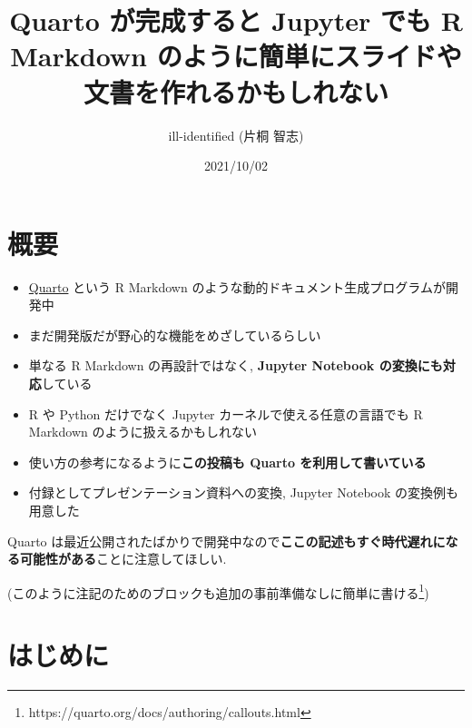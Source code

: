 \documentclass[
  letterpaper,
  DIV=11,
  pandoc,
  ja=standard,
  jafont=noto-otf]{bxjsarticle}
\title{Quarto が完成すると Jupyter でも R Markdown
のように簡単にスライドや文書を作れるかもしれない}
\author{ill-identified (片桐 智志)}
\date{2021/10/02}
\providecommand{\tightlist}{%
  \setlength{\itemsep}{0pt}\setlength{\parskip}{0pt}}
\begin{document}
\maketitle

{
\hypersetup{linkcolor=}
\setcounter{tocdepth}{3}
\tableofcontents
}
\hypertarget{ux6982ux8981}{%
\section*{概要}\label{ux6982ux8981}}

\begin{itemize}
\tightlist
\item
  \href{https://quarto.org/}{Quarto} という R Markdown
  のような動的ドキュメント生成プログラムが開発中
\item
  まだ開発版だが野心的な機能をめざしているらしい
\item
  単なる R Markdown の再設計ではなく, \textbf{Jupyter Notebook
  の変換にも対応}している
\item
  R や Python だけでなく Jupyter カーネルで使える任意の言語でも R
  Markdown のように扱えるかもしれない
\item
  使い方の参考になるように\textbf{この投稿も Quarto
  を利用して書いている}
\item
  付録としてプレゼンテーション資料への変換, Jupyter Notebook
  の変換例も用意した
\end{itemize}

\begin{tcolorbox}[colframe=quarto-callout-caution-color, colbacktitle=quarto-callout-caution-color!10!white, bottomtitle=1mm, bottomrule=.15mm, titlerule=0mm, toptitle=1mm, toprule=.15mm, title=\textcolor{quarto-callout-caution-color}{\faFire}\hspace{0.5em}注意, coltitle=black, rightrule=.15mm, leftrule=.75mm, arc=.35mm, colback=white, left=2mm]
Quarto
は最近公開されたばかりで開発中なので\textbf{ここの記述もすぐ時代遅れになる可能性がある}ことに注意してほしい.

(このように注記のためのブロックも追加の事前準備なしに簡単に書ける\footnote{https://quarto.org/docs/authoring/callouts.html})
\end{tcolorbox}

\hypertarget{ux306fux3058ux3081ux306b}{%
\section{はじめに}\label{ux306fux3058ux3081ux306b}}
\end{document}

